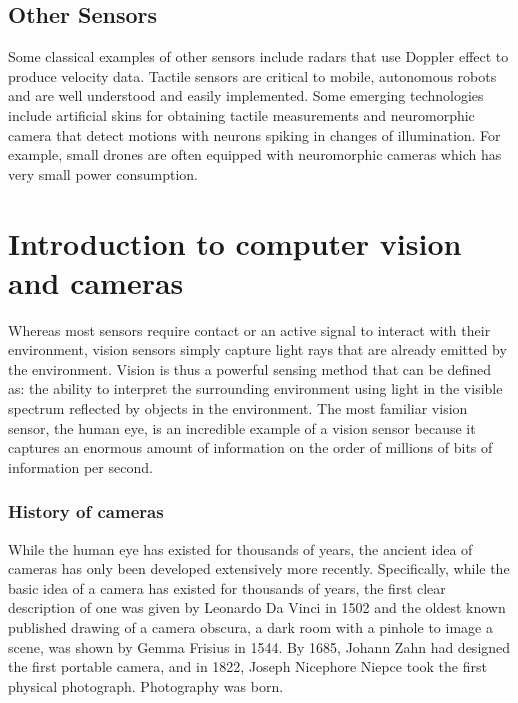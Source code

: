 \begin{itemize}
\subsection{Other Sensors}

Some classical examples of other sensors include radars that use Doppler effect to produce velocity data. Tactile sensors are critical to mobile, autonomous robots and are well understood and easily implemented. Some emerging technologies include artificial skins for obtaining tactile measurements and neuromorphic camera that detect motions with neurons spiking in changes of illumination. For example, small drones are often equipped with neuromorphic cameras which has very small power consumption.


\section{Introduction to computer vision and cameras}
Whereas most sensors require contact or an active signal to interact with their environment, vision sensors simply capture light rays that are already emitted by the environment. Vision is thus a powerful sensing method that can be defined as: the ability to interpret the surrounding environment using light in the visible spectrum reflected by objects in the environment. The most familiar vision sensor, the human eye, is an incredible example of a vision sensor because it captures an enormous amount of information on the order of millions of bits of information per second.

\subsubsection{History of cameras}

While the human eye has existed for thousands of years, the ancient idea of cameras has only been developed extensively more recently. Specifically, while the basic idea of a camera has existed for thousands of years, the first clear description of one was given by Leonardo Da Vinci in 1502 and the oldest known published drawing of a camera obscura, a dark room with a pinhole to image a scene, was shown by Gemma Frisius in 1544. By 1685, Johann Zahn had designed the first portable camera, and in 1822, Joseph Nicephore Niepce took the first physical photograph. Photography was born.


\end{itemize}
